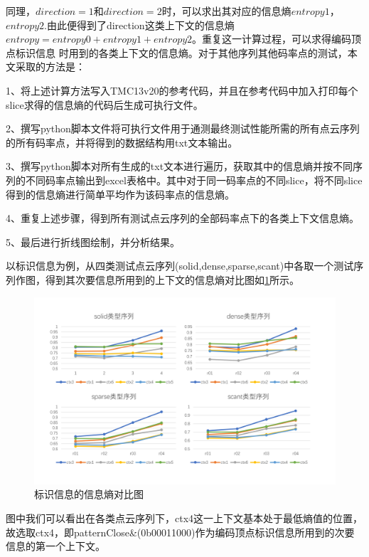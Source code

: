 \documentclass[bachelor,print,msfonts]{xduthesis}
\begin{document}
同理，$direction=1$和$direction=2$时，可以求出其对应的信息熵$entropy1$，$entropy2$.由此便得到了direction这类上下文的信息熵$entropy=entropy0+entropy1+entropy2$。重复这一计算过程，可以求得编码顶点标识信息
时用到的各类上下文的信息熵。对于其他序列其他码率点的测试，本文采取的方法是：

1、将上述计算方法写入TMC13v20的参考代码，并且在参考代码中加入打印每个slice求得的信息熵的代码后生成可执行文件。

2、撰写python脚本文件将可执行文件用于通测最终测试性能所需的所有点云序列的所有码率点，并将得到的数据结构用txt文本输出。

3、撰写python脚本对所有生成的txt文本进行遍历，获取其中的信息熵并按不同序列的不同码率点输出到excel表格中。其中对于同一码率点的不同slice，将不同slice得到的信息熵进行简单平均作为该码率点的信息熵。

4、重复上述步骤，得到所有测试点云序列的全部码率点下的各类上下文信息熵。

5、最后进行折线图绘制，并分析结果。

以标识信息为例，从四类测试点云序列(solid,dense,sparse,scant)中各取一个测试序列作图，得到其次要信息所用到的上下文的信息熵对比图如\ref{fig:信息熵对比图}所示。

\begin{figure}[h]
    \centering
    \includegraphics[scale=0.4]{image/flag信息熵对比图.png}
    \caption{标识信息的信息熵对比图}
    \label{fig:信息熵对比图}
\end{figure}

图中我们可以看出在各类点云序列下，ctx4这一上下文基本处于最低熵值的位置，故选取ctx4，即patternClose\&(0b00011000)作为编码顶点标识信息所用到的次要信息的第一个上下文。
\end{document}
